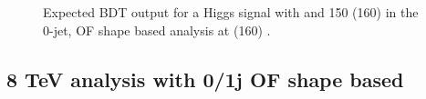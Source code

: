 \begin{figure}[!hbtp]
\centering
{}
\centering
{}
\caption{Expected BDT output for a Higgs signal with  and 150 (160) \GeVcc in the 0-jet, OF shape based analysis at   (160) \GeVcc.}
\label{fig:bdt_mh125}
\end{figure}

\clearpage

\subsection{8 TeV analysis with 0/1j OF shape based}

